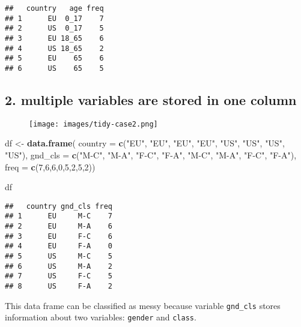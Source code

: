 \documentclass[]{book}
\newenvironment{Shaded}{\begin{snugshade}}{\end{snugshade}}
\newcommand{\KeywordTok}[1]{\textcolor[rgb]{0.13,0.29,0.53}{\textbf{{#1}}}}
\newcommand{\DataTypeTok}[1]{\textcolor[rgb]{0.13,0.29,0.53}{{#1}}}
\newcommand{\DecValTok}[1]{\textcolor[rgb]{0.00,0.00,0.81}{{#1}}}
\newcommand{\StringTok}[1]{\textcolor[rgb]{0.31,0.60,0.02}{{#1}}}
\newcommand{\NormalTok}[1]{{#1}}
\begin{document}
\begin{verbatim}
##   country   age freq
## 1      EU  0_17    7
## 2      US  0_17    5
## 3      EU 18_65    6
## 4      US 18_65    2
## 5      EU    65    6
## 6      US    65    5
\end{verbatim}

\clearpage

\subsection{2. multiple variables are stored in one
column}\label{multiple-variables-are-stored-in-one-column}

\begin{figure}[htbp]
\centering
\texttt{[image: images/tidy-case2.png]}
\caption{}
\end{figure}

\begin{Shaded}
\begin{Highlighting}[]
\NormalTok{df <-}\StringTok{ }\KeywordTok{data.frame}\NormalTok{(}
  \DataTypeTok{country =} \KeywordTok{c}\NormalTok{(}\StringTok{"EU"}\NormalTok{, }\StringTok{"EU"}\NormalTok{, }\StringTok{"EU"}\NormalTok{, }\StringTok{"EU"}\NormalTok{, }\StringTok{"US"}\NormalTok{, }\StringTok{"US"}\NormalTok{, }\StringTok{"US"}\NormalTok{, }\StringTok{"US"}\NormalTok{),}
  \DataTypeTok{gnd_cls =} \KeywordTok{c}\NormalTok{(}\StringTok{"M-C"}\NormalTok{, }\StringTok{"M-A"}\NormalTok{, }\StringTok{"F-C"}\NormalTok{, }\StringTok{"F-A"}\NormalTok{, }\StringTok{"M-C"}\NormalTok{, }\StringTok{"M-A"}\NormalTok{, }\StringTok{"F-C"}\NormalTok{, }\StringTok{"F-A"}\NormalTok{),}
  \DataTypeTok{freq =} \KeywordTok{c}\NormalTok{(}\DecValTok{7}\NormalTok{,}\DecValTok{6}\NormalTok{,}\DecValTok{6}\NormalTok{,}\DecValTok{0}\NormalTok{,}\DecValTok{5}\NormalTok{,}\DecValTok{2}\NormalTok{,}\DecValTok{5}\NormalTok{,}\DecValTok{2}\NormalTok{))}

\NormalTok{df}
\end{Highlighting}
\end{Shaded}

\begin{verbatim}
##   country gnd_cls freq
## 1      EU     M-C    7
## 2      EU     M-A    6
## 3      EU     F-C    6
## 4      EU     F-A    0
## 5      US     M-C    5
## 6      US     M-A    2
## 7      US     F-C    5
## 8      US     F-A    2
\end{verbatim}

This data frame can be classified as messy because variable
\texttt{gnd\_cls} stores information about two variables:
\texttt{gender} and \texttt{class}.
\end{document}
